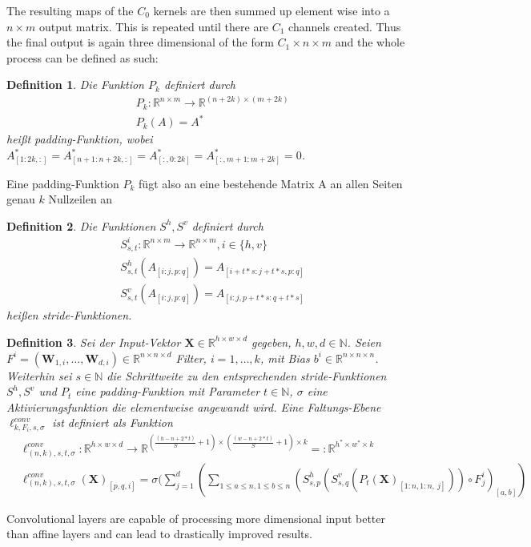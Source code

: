 \documentclass[a4paper,12pt,titlepage,enabledeprecatedfontcommands]{scrreprt}
\newtheorem{definition}{Definition}[chapter]
\begin{document}
The resulting maps of the $C_0$ kernels are then summed up element wise into a $n \times m$ output matrix. This is repeated until there are $C_1$ channels created. Thus the final output is again three dimensional of the form $C_1 \times n \times m$ and the whole process can be defined as such: \\
\begin{definition}
Die Funktion $P_k$ definiert durch
\begin{align*}
&P_k : \mathbb{R}^{n \times m} \rightarrow \mathbb{R}^{(n+2k) \times (m+2k)} \\
&P_k(A) = A^* 
\end{align*}
heißt padding-Funktion,
wobei $A^*_{[1:2k,:]} = A^*_{[n+1:n+2k,:]} = A^*_{[:,0:2k]} = A^*_{[:,m+1:m+2k]} = 0$.
\end{definition}
Eine padding-Funktion $P_k$ fügt also an eine bestehende Matrix A an allen Seiten genau $k$ Nullzeilen an
\begin{definition}
Die Funktionen $S^{h}, S^{v}$ definiert durch
\begin{align*}
&S^{i}_{s,t} : \mathbb{R}^{n \times m} \rightarrow \mathbb{R}^{n \times m}, i \in \lbrace h,v \rbrace \\
&S^{h}_{s,t}(A_{[i:j,p:q]}) = A_{[i+t*s:j+t*s,p:q]} \\
&S^{v}_{s,t}(A_{[i:j,p:q]}) = A_{[i:j,p+t*s:q+t*s]} 
\end{align*}
heißen stride-Funktionen.
\end{definition}
\begin{definition} \label{convlayer}
Sei der Input-Vektor $\bm{X} \in \mathbb{R}^{h \times w \times d}$ gegeben, $h,w,d \in \mathbb{N}$.
Seien $F^i = (\bm{W}_{1,i},\ldots,\bm{W}_{d,i}) \in \mathbb{R}^{n \times n \times d}$ Filter, $i=1,\ldots ,k$, mit Bias $b^i \in \mathbb{R}^{n \times n  \times n}$. Weiterhin sei $s \in \mathbb{N}$ die Schrittweite zu den entsprechenden stride-Funktionen $S^{h}, S^{v}$ und $P_t$ eine padding-Funktion mit Parameter $t \in \mathbb{N}$, $\sigma$ eine Aktivierungsfunktion die elementweise angewandt wird.
Eine Faltungs-Ebene $\ell^{conv}_{k,F_i,s,\sigma}$ ist definiert als Funktion
\begin{align}
&\ell^{conv}_{(n,k),s,t,\sigma} : \mathbb{R}^{h \times w \times d} \rightarrow \mathbb{R}^{(\frac{(h-n+2*t)}{S}+1) \times (\frac{(w-n+2*t)}{S}+1) \times k} =: \mathbb{R}^{h^* \times w^* \times k} \\
&\ell^{conv}_{(n,k),s,t,\sigma}(\bm{X})_{[p,q,i]} = \sigma(\sum_{j=1}^{d}(\sum_{1 \leq a \leq n, 1 \leq b \leq n} (S^{h}_{s,p}(S^{v}_{s,q}(P_t(\bm{X})_{[1:n,1:n, \ j]})) \circ F^{i}_{j})_{[a,b]})
\end{align}
\end{definition}
Convolutional layers are capable of processing more dimensional input better than affine layers and can lead to drastically improved results. \\
\end{document}

